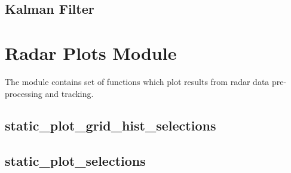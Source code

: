 \documentclass[letterpaper,10pt,english]{sphinxmanual}
\begin{document}
\section{Kalman Filter}
\label{\detokenize{trackingfilters:kalman-filter}}

\begin{fulllineitems}
\label{\detokenize{trackingfilters:tracking_filters.KalmanFilter}}
\end{fulllineitems}



\chapter{Radar Plots Module}
\label{\detokenize{radarplots::doc}}\label{\detokenize{radarplots:radar-plots-module}}
The module contains set of functions which plot results from radar data pre-processing and tracking.
\label{\detokenize{radarplots:module-radar_plots}}

\section{static\_plot\_grid\_hist\_selections}
\label{\detokenize{radarplots:static-plot-grid-hist-selections}}

\begin{fulllineitems}
\label{\detokenize{radarplots:radar_plots.static_plot_grid_hist_selections}}
\end{fulllineitems}



\section{static\_plot\_selections}
\label{\detokenize{radarplots:static-plot-selections}}

\begin{fulllineitems}
\label{\detokenize{radarplots:radar_plots.static_plot_selections}}
\end{fulllineitems}
\end{document}
